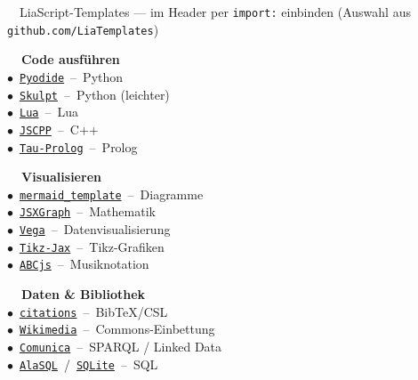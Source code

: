 \documentclass[a4paper,landscape,9pt]{extarticle}
\begin{document}
\noindent
\begin{liainfo}{\faPuzzlePiece~~LiaScript-Templates — im Header per \texttt{import:} einbinden (Auswahl aus \texttt{github.com/LiaTemplates})}
\footnotesize
\begin{minipage}[t]{0.24\linewidth}
\textbf{\color{liagreen}\faTerminal~~Code ausführen}\\[1pt]
$\bullet$~\href{https://github.com/LiaTemplates/Pyodide}{\texttt{Pyodide}}~–~Python\\
$\bullet$~\href{https://github.com/LiaTemplates/Skulpt}{\texttt{Skulpt}}~–~Python (leichter)\\
$\bullet$~\href{https://github.com/LiaTemplates/Lua}{\texttt{Lua}}~–~Lua\\
$\bullet$~\href{https://github.com/LiaTemplates/JSCPP}{\texttt{JSCPP}}~–~C++\\
$\bullet$~\href{https://github.com/LiaTemplates/Tau-Prolog}{\texttt{Tau-Prolog}}~–~Prolog
\end{minipage}\hfill
\begin{minipage}[t]{0.24\linewidth}
\textbf{\color{liagreen}\faChartBar~~Visualisieren}\\[1pt]
$\bullet$~\href{https://github.com/LiaTemplates/mermaid_template}{\texttt{mermaid\_template}}~–~Diagramme\\
$\bullet$~\href{https://github.com/LiaTemplates/JSXGraph}{\texttt{JSXGraph}}~–~Mathematik\\
$\bullet$~\href{https://github.com/LiaTemplates/Vega}{\texttt{Vega}}~–~Datenvisualisierung\\
$\bullet$~\href{https://github.com/LiaTemplates/Tikz-Jax}{\texttt{Tikz-Jax}}~–~Tikz-Grafiken\\
$\bullet$~\href{https://github.com/LiaTemplates/ABCjs}{\texttt{ABCjs}}~–~Musiknotation
\end{minipage}\hfill
\begin{minipage}[t]{0.24\linewidth}
\textbf{\color{liagreen}\faDatabase~~Daten \& Bibliothek}\\[1pt]
$\bullet$~\href{https://github.com/LiaTemplates/citations}{\texttt{citations}}~–~BibTeX/CSL\\
$\bullet$~\href{https://github.com/LiaTemplates/Wikimedia}{\texttt{Wikimedia}}~–~Commons-Einbettung\\
$\bullet$~\href{https://github.com/LiaTemplates/Comunica}{\texttt{Comunica}}~–~SPARQL / Linked Data\\
$\bullet$~\href{https://github.com/LiaTemplates/AlaSQL}{\texttt{AlaSQL}}~/~\href{https://github.com/LiaTemplates/SQLite}{\texttt{SQLite}}~–~SQL\\

\end{minipage}
\end{liainfo}
\end{document}
